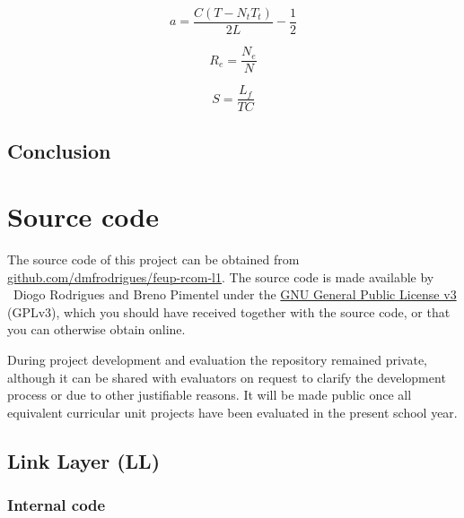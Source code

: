 \documentclass[a4paper, 11pt]{report}
\begin{document}
\begin{equation*}
	a = \frac{C(T - N_t T_t)}{2 L} - \frac{1}{2}
\end{equation*}

\begin{equation*}
	R_e = \frac{N_e}{N}
\end{equation*}

\begin{equation*}
	S = \frac{L_f}{T C}
\end{equation*}

\section{Conclusion} \label{sec:Conclusion}

\pagebreak

\appendix
\appendixpage
\addappheadtotoc
\chapter{Source code}

The source code of this project can be obtained from \href{https://github.com/dmfrodrigues/feup-rcom-l1}{github.com/dmfrodrigues/feup-rcom-l1}. The source code is made available by \textcopyright~Diogo Rodrigues and Breno Pimentel under the \href{https://www.gnu.org/licenses/gpl-3.0.en.html}{GNU General Public License v3} (GPLv3), which you should have received together with the source code, or that you can otherwise obtain online.

During project development and evaluation the repository remained private, although it can be shared with evaluators on request to clarify the development process or due to other justifiable reasons. It will be made public once all equivalent curricular unit projects have been evaluated in the present school year.


\fancyhfoffset[E,O]{0pt}

\section{Link Layer (LL)}



\subsection{Internal code}


\end{document}
